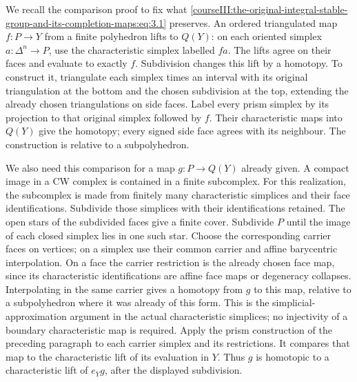 We recall the comparison proof to fix what \eqref{courseIII:the-original-integral-stable-group-and-its-completion-maps:eq:3.1} preserves. An ordered triangulated map \(f:P\to Y\) from a finite polyhedron lifts to \(Q(Y)\): on each oriented simplex \(a:\Delta^n\to P\), use the characteristic simplex labelled \(f a\). The lifts agree on their faces and evaluate to exactly \(f\). Subdivision changes this lift by a homotopy. To construct it, triangulate each simplex times an interval with its original triangulation at the bottom and the chosen subdivision at the top, extending the already chosen triangulations on side faces. Label every prism simplex by its projection to that original simplex followed by \(f\). Their characteristic maps into \(Q(Y)\) give the homotopy; every signed side face agrees with its neighbour. The construction is relative to a subpolyhedron.

We also need this comparison for a map \(g:P\to Q(Y)\) already given. A compact image in a CW complex is contained in a finite subcomplex. For this realization, the subcomplex is made from finitely many characteristic simplices and their face identifications. Subdivide those simplices with their identifications retained. The open stars of the subdivided faces give a finite cover. Subdivide \(P\) until the image of each closed simplex lies in one such star. Choose the corresponding carrier faces on vertices; on a simplex use their common carrier and affine barycentric interpolation. On a face the carrier restriction is the already chosen face map, since its characteristic identifications are affine face maps or degeneracy collapses. Interpolating in the same carrier gives a homotopy from \(g\) to this map, relative to a subpolyhedron where it was already of this form. This is the simplicial-approximation argument in the actual characteristic simplices; no injectivity of a boundary characteristic map is required. Apply the prism construction of the preceding paragraph to each carrier simplex and its restrictions. It compares that map to the characteristic lift of its evaluation in \(Y\). Thus \(g\) is homotopic to a characteristic lift of \(e_Yg\), after the displayed subdivision.

